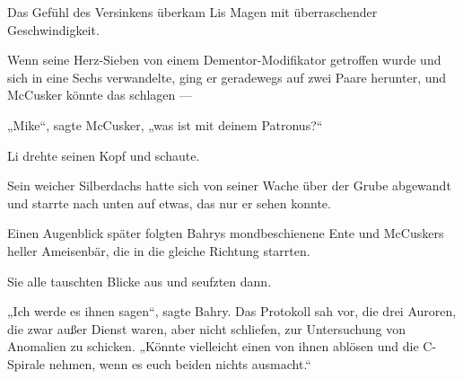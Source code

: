Das Gefühl des Versinkens überkam Lis Magen mit überraschender Geschwindigkeit.

Wenn seine Herz-Sieben von einem Dementor-Modifikator getroffen wurde und sich in eine Sechs verwandelte, ging er geradewegs auf zwei Paare herunter, und McCusker könnte das schlagen —

„Mike“, sagte McCusker, „was ist mit deinem Patronus?“

Li drehte seinen Kopf und schaute.

Sein weicher Silberdachs hatte sich von seiner Wache über der Grube abgewandt und starrte nach unten auf etwas, das nur er sehen konnte.

Einen Augenblick später folgten Bahrys mondbeschienene Ente und McCuskers heller Ameisenbär, die in die gleiche Richtung starrten.

Sie alle tauschten Blicke aus und seufzten dann.

„Ich werde es ihnen sagen“, sagte Bahry. Das Protokoll sah vor, die drei Auroren, die zwar außer Dienst waren, aber nicht schliefen, zur Untersuchung von Anomalien zu schicken.
„Könnte vielleicht einen von ihnen ablösen und die C-Spirale nehmen, wenn es euch beiden nichts ausmacht.“

